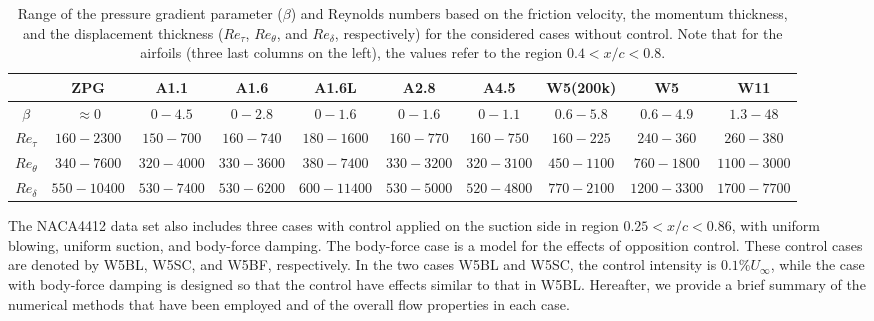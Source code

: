 \begin{table}
  \fontsize{5.0pt}{10.25pt}\selectfont
  \addtolength{\tabcolsep}{-2pt}
\begin{tabular}{cccccccccc}
\hline \hline
 & ZPG & A1.1 & A1.6 & A1.6L & A2.8 & A4.5 & W5(200k) & W5 & W11\\ \hline
$\beta$ & $\approx 0$ & $0-4.5$  & $0-2.8$  & $0-1.6$ & $0-1.6$ & $0-1.1$ & $0.6-5.8$ & $0.6-4.9$ & $1.3-48$ \\ \hline
$Re_\tau$ & $ 160-2300$ & $150-700$  & $160-740$  & $180-1600$ & $160-770$ & $160-750$ & $160-225$ & $240-360$ & $260-380$ \\ 
$Re_\theta$ & $340-7600$ & $320-4000$ & $330-3600$ & $380-7400$  & $330-3200$ & $320-3100$ & $450-1100$ & $760-1800$ & $1100-3000$\\
$Re_{\delta}$ & $550-10400$ & $530-7400$ & $530-6200$  & $600-11400$ & $530-5000 $ & $520-4800 $ & $770-2100 $ & $1200-3300$ & $1700-7700 $ \\
\hline \hline
\end{tabular}
\caption{\label{tab:dataset} Range of the pressure gradient parameter ($\beta$) and Reynolds numbers based on the friction velocity, the momentum thickness, and the displacement thickness ($Re_\tau$, $Re_\theta$, and $Re_{\delta}$, respectively) for the considered cases without control. Note that for the airfoils (three last columns on the left), the values refer to the region $0.4<x/c<0.8$.}
\end{table}


The NACA4412 data set also includes three cases with control applied on the suction side in region $0.25<x/c<0.86$, with uniform blowing, uniform suction, and body-force damping. The body-force case is a model for the effects of opposition control\cite{stro16}. These control cases are denoted by W5BL, W5SC, and W5BF, respectively. In the two cases W5BL and W5SC, the control intensity is $0.1\%U_\infty$, while the case with body-force damping is designed so that the control have effects similar to that in W5BL. Hereafter, we provide a brief summary of the numerical methods that have been employed and of the overall flow properties in each case.

